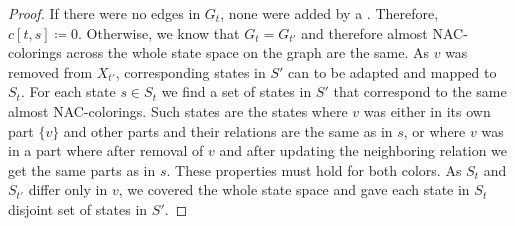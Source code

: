 %
%
\begin{proof}
	If there were no edges in \( G_t \), none were added by a \ForgetVertexNode{}.
	Therefore, \( c[t, s] \coloneqq 0 \).
	Otherwise, we know that \( G_t = G_{t'} \) and therefore
	almost NAC-colorings across the whole state space on the graph are the same.
	As \( v \) was removed from \( X_{t'} \),
	corresponding states in \( S' \) can to be adapted and mapped to \( S_t \).
	For each state \( s \in S_t \) we find a set of states in \( S' \)
	that correspond to the same almost NAC-colorings.
	Such states are the states where \( v \) was either in its own part \( \{v\} \)
	and other parts and their relations are the same as in \( s \),
	or where \( v \) was in a part where after removal of \( v \) and
	after updating the neighboring relation we get the same parts as in \( s \).
	These properties must hold for both colors.
	As \( S_t \) and \( S_{t'} \) differ only in \( v \),
	we covered the whole state space and gave each state in \( S_t \) disjoint
	set of states in \( S' \).

\end{proof}
%

